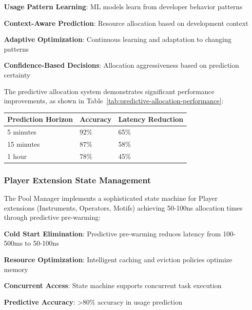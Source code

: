 \begin{expandedlist}
    \item \textbf{Usage Pattern Learning}: ML models learn from developer behavior patterns
    \item \textbf{Context-Aware Prediction}: Resource allocation based on development context
    \item \textbf{Adaptive Optimization}: Continuous learning and adaptation to changing patterns
    \item \textbf{Confidence-Based Decisions}: Allocation aggressiveness based on prediction certainty
\end{expandedlist}

The predictive allocation system demonstrates significant performance improvements, as shown in Table~\ref{tab:predictive-allocation-performance}:

\begin{center}
\begin{tabular}{@{}lll@{}}
\toprule
\textbf{Prediction Horizon} & \textbf{Accuracy} & \textbf{Latency Reduction} \\
\midrule
5 minutes & 92\% & 65\% \\
15 minutes & 87\% & 58\% \\
1 hour & 78\% & 45\% \\
\bottomrule
\end{tabular}
\label{tab:predictive-allocation-performance}
\end{center}

\subsubsection*{Player Extension State Management}

The Pool Manager implements a sophisticated state machine for Player extensions (Instruments, Operators, Motifs) achieving 50-100ns allocation times through predictive pre-warming:

\begin{compactlist}
    \item \textbf{Cold Start Elimination}: Predictive pre-warming reduces latency from 100-500ms to 50-100ns
    \item \textbf{Resource Optimization}: Intelligent caching and eviction policies optimize memory
    \item \textbf{Concurrent Access}: State machine supports concurrent task execution
    \item \textbf{Predictive Accuracy}: >80\% accuracy in usage prediction
\end{compactlist}

